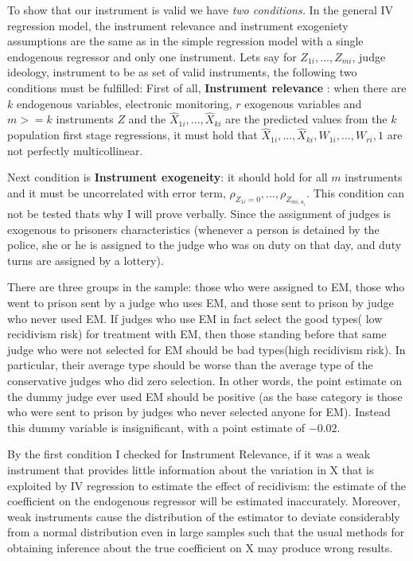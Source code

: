 \documentclass[a4paper,12pt]{article}
\begin{document}
To show that our instrument is valid we have\textit{ two conditions.} In the general IV regression model, the instrument relevance and instrument exogeniety assumptions are the same as in the simple regression model with a single endogenous regressor and only one instrument. Lets say for $Z_{1i},...,Z_{mi}$, judge ideology, instrument to be as set of valid instruments, the following two conditions must be fulfilled: First of all, \textbf{Instrument relevance} : when there are $k$ endogenous variables, electronic monitoring, $r$ exogenous variables and $m >= k$ instruments $Z$ and the $\widehat{X}_{1i} ,..., \widehat{X}_{ki}$ are the predicted values from the  $k$ population first stage regressions, it must hold that $\widehat{X}_{1i} ,..., \widehat{X}_{ki}, W_{1i},...,W_{ri}, 1$ are not perfectly multicollinear. 

Next condition is \textbf{Instrument exogeneity}: it should hold for all $m$ instruments  and it must be uncorrelated with error term, $\rho_{Z_{1i} = 0} ,..., \rho_{Z_{mi,u_i}}$. This condition can not be tested thats why I will prove verbally. Since the assignment of judges is exogenous to prisoners characteristics (whenever a person is detained by the police, she or he is assigned to the judge who was on duty on that day, and duty turns are assigned by a lottery). 

There are three groups in the sample: those who were assigned to EM, those who went to prison sent by a judge who uses EM, and those sent to prison by judge who never used EM. If judges who use EM in fact select the good types( low recidivism risk) for treatment with EM, then those standing before that same judge who were not selected for EM should be bad types(high recidivism risk). In particular, their average type should be worse than the average type of the conservative judges who did zero selection. In other words, the point estimate on the dummy judge ever used EM should be positive (as the base category is those who were sent to prison by judges who never selected anyone for EM). Instead this dummy variable is insignificant, with a point estimate of $-0.02$. 

By the first condition I checked for Instrument Relevance, if it was a weak instrument that provides little information about the variation in X that is exploited by IV regression to estimate the effect of recidivism: the estimate of the coefficient on the endogenous regressor will be  estimated inaccurately. Moreover, weak instruments cause the distribution of the estimator to deviate considerably from a normal distribution even in large samples such that the usual methods for obtaining inference about the true coefficient on  X may produce wrong results. 
\end{document}
